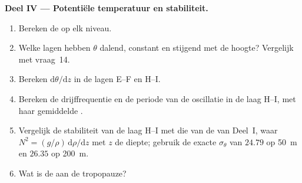 \begin{problem}
\medskip
\noindent\textbf{Deel IV --- Potentiële temperatuur en stabiliteit.}
\begin{enumerate}[resume]
  \item Bereken de  op elk niveau.
  \item Welke lagen hebben $\theta$ dalend, constant en stijgend met de hoogte? Vergelijk met vraag~14.
  \item Bereken $\mathrm d\theta/\mathrm dz$ in de lagen E--F en H--I.
  \item Bereken de drijffrequentie en de periode van de oscillatie in de laag H--I, met haar gemiddelde .
  \item Vergelijk de stabiliteit van de laag H--I met die van de  van Deel~I, waar $N^2 = (g/\rho)\,\mathrm d\rho/\mathrm dz$ met $z$ de diepte; gebruik de exacte $\sigma_\theta$ van $24.79$ op \qty{50}{m} en $26.35$ op \qty{200}{m}.
  \item Wat is de  aan de tropopauze?
\end{enumerate}
\end{problem}
